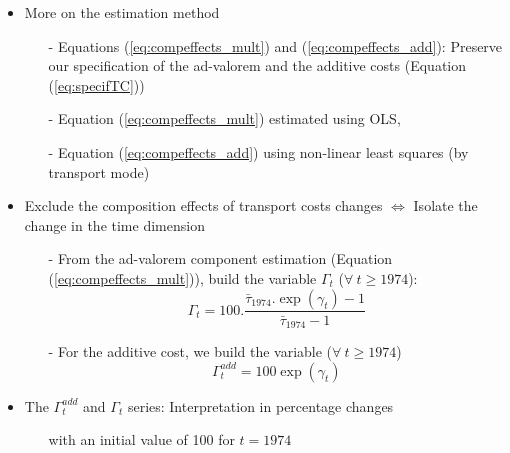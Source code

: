 \documentclass[10 pt,Helvetica, french]{beamer}
\begin{document}
\begin{frame}
\begin{itemize}
\item More on the estimation method
\begin{itemize}
\item[-] Equations (\ref{eq:compeffects_mult}) and (\ref{eq:compeffects_add}): Preserve our specification of the ad-valorem and the additive costs (Equation (\ref{eq:specifTC})) \vspace{0.1cm}
\item[-] Equation (\ref{eq:compeffects_mult}) estimated using OLS, \vspace{0.1cm}
\item[-] Equation (\ref{eq:compeffects_add}) using non-linear least squares (by transport mode) \vspace{0.1cm}
\end{itemize}
\item Exclude the composition effects of transport costs changes $\Leftrightarrow$ Isolate the change in the time dimension  \vspace{0.1cm}
\begin{itemize}
\item[-] From the ad-valorem component estimation (Equation (\ref{eq:compeffects_mult})), build the variable $\Gamma_t$ ($\forall~t \geq 1974$):
\begin{equation*}
\Gamma_t = 100.\frac {\bar{\tau}_{1974}.\exp(\gamma_t)-1} {\bar{\tau}_{1974}-1}
\end{equation*}
\item[-] For the additive cost, we build the variable ($\forall~t \geq 1974$)
$$\Gamma^{add}_t = 100 \exp(\gamma_t)$$
\end{itemize}
\item The $\Gamma^{add}_t$ and $\Gamma_t$ series: Interpretation in percentage changes
\begin{itemize}
\item[] with an initial value of 100 for $t=1974$
\end{itemize}


\end{itemize}
 \hyperlink{slide_compositioneffects}{}
\end{frame}
\end{document}
